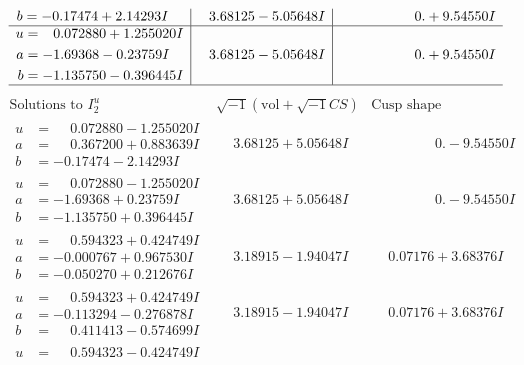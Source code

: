 \documentclass[1p]{elsarticle_modified}
\theoremstyle{definition}
\newcommand{\I}{\sqrt{-1}}
\begin{document}
$$\begin{array}{c|c|c}
\begin{aligned}
b &= -0.17474 + 2.14293 I\end{aligned}
 & \phantom{-}3.68125 - 5.05648 I & \phantom{-0.000000 -}0. + 9.54550 I \\ \hline\begin{aligned}
u &= \phantom{-}0.072880 + 1.255020 I \\
a &= -1.69368 - 0.23759 I \\
b &= -1.135750 - 0.396445 I\end{aligned}
 & \phantom{-}3.68125 - 5.05648 I & \phantom{-0.000000 -}0. + 9.54550 I\\
 \hline 
 \end{array}$$\newpage$$\begin{array}{c|c|c}  
\text{Solutions to }I^u_{2}& \I (\text{vol} + \sqrt{-1}CS) & \text{Cusp shape}\\
 \hline 
\begin{aligned}
u &= \phantom{-}0.072880 - 1.255020 I \\
a &= \phantom{-}0.367200 + 0.883639 I \\
b &= -0.17474 - 2.14293 I\end{aligned}
 & \phantom{-}3.68125 + 5.05648 I & \phantom{-0.000000 } 0. - 9.54550 I \\ \hline\begin{aligned}
u &= \phantom{-}0.072880 - 1.255020 I \\
a &= -1.69368 + 0.23759 I \\
b &= -1.135750 + 0.396445 I\end{aligned}
 & \phantom{-}3.68125 + 5.05648 I & \phantom{-0.000000 } 0. - 9.54550 I \\ \hline\begin{aligned}
u &= \phantom{-}0.594323 + 0.424749 I \\
a &= -0.000767 + 0.967530 I \\
b &= -0.050270 + 0.212676 I\end{aligned}
 & \phantom{-}3.18915 - 1.94047 I & \phantom{-}0.07176 + 3.68376 I \\ \hline\begin{aligned}
u &= \phantom{-}0.594323 + 0.424749 I \\
a &= -0.113294 - 0.276878 I \\
b &= \phantom{-}0.411413 - 0.574699 I\end{aligned}
 & \phantom{-}3.18915 - 1.94047 I & \phantom{-}0.07176 + 3.68376 I \\ \hline\begin{aligned}
u &= \phantom{-}0.594323 - 0.424749 I \\

\end{aligned}
\end{array}$$
\end{document}
